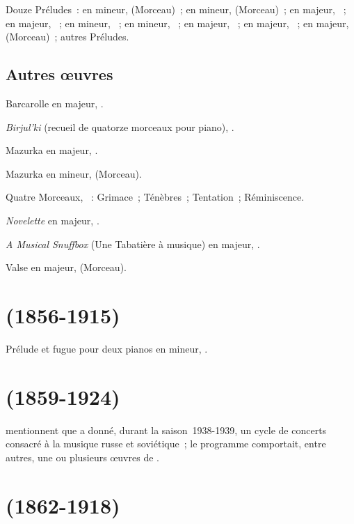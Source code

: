 Douze Préludes~: en \kB mineur,   (Morceau)~; en \kB
\Flat mineur,   (Morceau)~; en \kF \Sharp majeur,
 ~; en \kG majeur,  ~; en \kC mineur,
 ~; en \kD mineur,  ~; en \kD \Flat
majeur,  ~; en \kB \Flat majeur,  ~;
en \kD \Flat majeur,   (Morceau)~; autres Préludes.

\subsection{Autres œuvres}

Barcarolle en \kF \Sharp majeur, .

\emph{Birjul'ki} (recueil de quatorze morceaux pour piano), .

Mazurka en \kF majeur, .

Mazurka en \kF mineur,   (Morceau).

Quatre Morceaux, ~:  Grimace~;  Ténèbres~;
 Tentation~;  Réminiscence.

\emph{Novelette} en \kC majeur, .

\emph{A Musical Snuffbox} (Une Tabatière à musique) en \kA majeur,
.

Valse en \kE majeur,   (Morceau).

\section[%
Sergej Taneev (1856-1915)]{%
\STaneiev{} (1856-1915)}

Prélude et fugue pour deux pianos en \kG \Sharp mineur, .

\section[%
Sergej Ljapunov (1859-1924)]{%
\SLiapounov{} (1859-1924)}

\citet[p.~413]{Scriabine} mentionnent que \VSofronitsky{} a donné, durant
la saison~1938-1939, un cycle de concerts consacré à la musique russe et
soviétique~; le programme comportait, entre autres, une ou plusieurs œuvres
de \SLiapounov{}.

\section[%
Claude Debussy (1862-1918)]{%
\CDebussy{} (1862-1918)}

